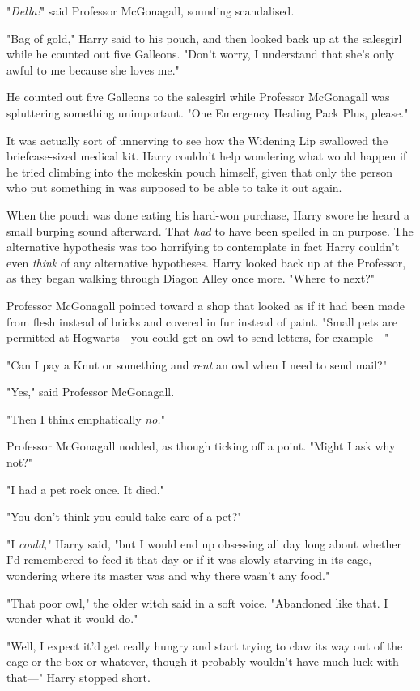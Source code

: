 "\emph{Della!}" said Professor McGonagall, sounding scandalised.

"Bag of gold," Harry said to his pouch, and then looked back up at the
salesgirl while he counted out five Galleons. "Don't worry, I understand that
she's only awful to me because she loves me."

He counted out five Galleons to the salesgirl while Professor McGonagall was
spluttering something unimportant. "One Emergency Healing Pack Plus, please."

It was actually sort of unnerving to see how the Widening Lip swallowed the
briefcase-sized medical kit. Harry couldn't help wondering what would happen if
he tried climbing into the mokeskin pouch himself, given that only the person
who put something in was supposed to be able to take it out again.

When the pouch was done{\el} eating{\el} his hard-won purchase, Harry
swore he heard a small burping sound afterward. That \emph{had} to have been
spelled in on purpose. The alternative hypothesis was too horrifying to
contemplate{\el} in fact Harry couldn't even \emph{think} of any alternative
hypotheses. Harry looked back up at the Professor, as they began walking
through Diagon Alley once more. "Where to next?"

Professor McGonagall pointed toward a shop that looked as if it had been made
from flesh instead of bricks and covered in fur instead of paint. "Small pets
are permitted at Hogwarts—you could get an owl to send letters, for
example—"

"Can I pay a Knut or something and \emph{rent} an owl when I need to send mail?"

"Yes," said Professor McGonagall.

"Then I think emphatically \emph{no.}"

Professor McGonagall nodded, as though ticking off a point. "Might I ask why
not?"

"I had a pet rock once. It died."

"You don't think you could take care of a pet?"

"I \emph{could,}" Harry said, "but I would end up obsessing all day long about
whether I'd remembered to feed it that day or if it was slowly starving in its
cage, wondering where its master was and why there wasn't any food."

"That poor owl," the older witch said in a soft voice. "Abandoned like that. I
wonder what it would do."

"Well, I expect it'd get really hungry and start trying to claw its way out of
the cage or the box or whatever, though it probably wouldn't have much luck
with that—" Harry stopped short.

